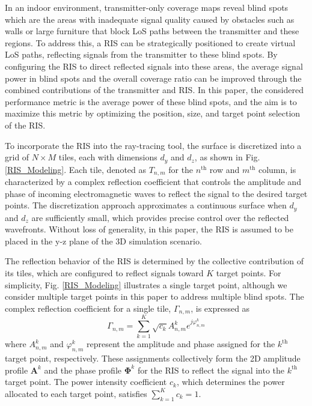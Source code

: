 \documentclass{IEEEoj}
\begin{document}
In an indoor environment, transmitter-only coverage maps reveal blind spots which are the areas with inadequate signal quality caused by obstacles such as walls or large furniture that block LoS paths between the transmitter and these regions. To address this, a RIS can be strategically positioned to create virtual LoS paths, reflecting signals from the transmitter to these blind spots. By configuring the RIS to direct reflected signals into these areas, the average signal power in blind spots and the overall coverage ratio can be improved through the combined contributions of the transmitter and RIS. In this paper, the considered performance metric is the average power of these blind spots, and the aim is to maximize this metric by optimizing the position, size, and target point selection of the RIS.

To incorporate the RIS into the ray-tracing tool, the surface is discretized into a grid of $N \times M$ tiles, each with dimensions $d_y$ and $d_z$, as shown in Fig. \ref{RIS_Modeling}. Each tile, denoted as $T_{n,m}$ for the $n^{\text{th}}$ row and $m^{\text{th}}$ column, is characterized by a complex reflection coefficient that controls the amplitude and phase of incoming electromagnetic waves to reflect the signal to the desired target points. The discretization approach approximates a continuous surface when $d_y$ and $d_z$ are sufficiently small, which provides precise control over the reflected wavefronts. Without loss of generality, in this paper, the RIS is assumed to be placed in the y-z plane of the 3D simulation scenario.

The reflection behavior of the RIS is determined by the collective contribution of its tiles, which are configured to reflect signals toward $K$ target points. For simplicity, Fig. \ref{RIS_Modeling} illustrates a single target point, although we consider multiple target points in this paper to address multiple blind spots. The complex reflection coefficient for a single tile, $\Gamma_{n,m}$, is expressed as
\begin{equation} \label{ref_coef_exp}
	\Gamma_{n,m} = \sum \limits_{k=1}^K \sqrt{c_k} A_{n,m}^k e^{j \varphi_{n,m}^k}
\end{equation}
where $A_{n,m}^k$ and $\varphi_{n,m}^k$ represent the amplitude and phase assigned for the $k^{\text{th}}$ target point, respectively. These assignments collectively form the 2D amplitude profile $\mathbf{A}^k$ and the phase profile $\mathbf{\Phi}^k$ for the RIS to reflect the signal into the $k^{\text{th}}$ target point. The power intensity coefficient $c_k$, which determines the power allocated to each target point, satisfies $\sum_{k=1}^K c_k = 1$.
\end{document}
